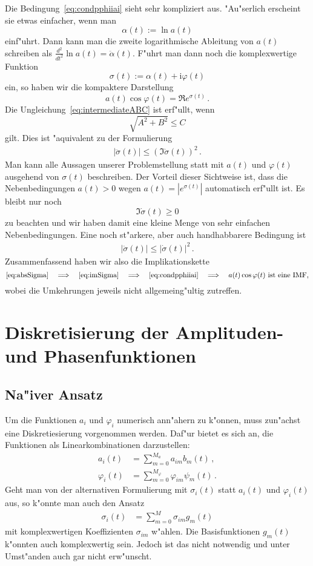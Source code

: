 \documentclass[a4paper]{scrartcl}
\newcommand{\ii}{{\mathrm{i}}}
\newcommand{\pphi}{{\varphi}}
\begin{document}
Die Bedingung~\eqref{eq:condpphiiai} sieht sehr kompliziert aus. "Au"serlich erscheint sie etwas einfacher, wenn man
$$ \alpha(t):=\ln a(t) $$
einf"uhrt. Dann kann man die zweite logarithmische Ableitung von $a(t)$ schreiben als $\frac{d^2}{dt^2}\ln a(t) = \ddot\alpha(t)$. F"uhrt man dann noch die komplexwertige Funktion
$$ \sigma(t) := \alpha(t) + \ii\pphi(t) $$
ein, so haben wir die kompaktere Darstellung
$$ a(t)\cos\pphi(t) = \Re e^{\sigma(t)}\,. $$
Die Ungleichung~\eqref{eq:intermediateABC} ist erf"ullt, wenn 
$$ \sqrt{A^2 + B^2} \le C $$
gilt. Dies ist "aquivalent zu der Formulierung
\begin{align} \label{eq:imSigma}
  \lvert\ddot\sigma(t)\rvert \le \left(\Im\dot\sigma(t)\right)^2\,.
\end{align}
Man kann alle Aussagen unserer Problemstellung statt mit $a(t)$ und $\pphi(t)$ ausgehend von $\sigma(t)$ beschreiben. Der Vorteil dieser Sichtweise ist, dass die Nebenbedingungen $a(t)>0$ wegen $a(t)=|e^{\sigma(t)}|$ automatisch erf"ullt ist. Es bleibt nur noch 
$$ \Im\dot\sigma(t)\ge0 $$ 
zu beachten und wir haben damit eine kleine Menge von sehr einfachen Nebenbedingungen. Eine noch st"arkere, aber auch handhabbarere Bedingung ist 
\begin{align} \label{eq:absSigma}
  \lvert\ddot\sigma(t)\rvert \le\lvert\dot\sigma(t)\rvert^2\,.
\end{align}
Zusammenfassend haben wir also die Implikationskette 
$$ \text{\eqref{eq:absSigma}} \quad \Longrightarrow \quad
  \text{\eqref{eq:imSigma}} \quad \Longrightarrow \quad
  \text{\eqref{eq:condpphiiai}} \quad \Longrightarrow \quad
  \text{$a(t)\cos\pphi(t)$ ist eine IMF,} $$
wobei die Umkehrungen jeweils nicht allgemeing"ultig zutreffen. 


\section{Diskretisierung der Amplituden- und Phasenfunktionen} \label{sec:discretize}

\subsection{Na"iver Ansatz}

Um die Funktionen $a_i$ und $\pphi_i$ numerisch ann"ahern zu k"onnen, muss zun"achst eine Diskretiesierung vorgenommen werden. Daf"ur bietet es sich an, die Funktionen als Linearkombinationen darzustellen:
\begin{align*}
      a_i(t) &= \sum_{m=0}^{M_a    }     a_{im}    b_m(t)\,, \\ 
  \pphi_i(t) &= \sum_{m=0}^{M_\pphi} \pphi_{im} \psi_m(t)\,.
\end{align*}
Geht man von der alternativen Formulierung mit $\sigma_i(t)$ statt $a_i(t)$ und $\pphi_i(t)$ aus, so k"onnte man auch den Ansatz
\begin{align*}
  \sigma_i(t) &= \sum_{m=0}^M \sigma_{im}g_m(t)
\end{align*}
mit komplexwertigen Koeffizienten $\sigma_{im}$ w"ahlen. Die Basisfunktionen $g_m(t)$ k"onnten auch komplexwertig sein. Jedoch ist das nicht notwendig und unter Umst"anden auch gar nicht erw"unscht. 
\end{document}
